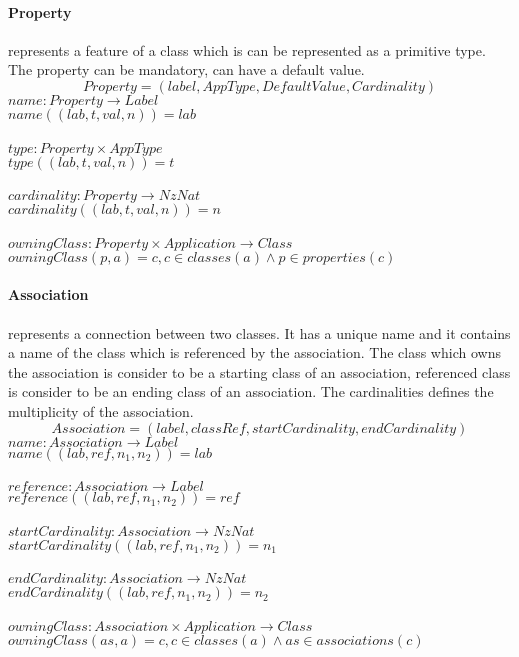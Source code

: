 \documentclass[11pt]{article}
\begin{document}
\paragraph{Property} represents a feature of  a class which is can be represented as a primitive type. The property can be mandatory, can have a default value.
$$
Property = (label, AppType, DefaultValue, Cardinality)
$$
$name : Property \rightarrow Label$ \\
$name((lab, t, val, n)) = lab$ \\ \\
$type : Property \times AppType$ \\
$type((lab, t, val, n)) = t$ \\ \\
$cardinality : Property \rightarrow NzNat$ \\
$cardinality((lab, t, val, n)) = n$ \\ \\
$owningClass : Property \times Application \rightarrow Class $ \\
$owningClass(p, a) = c, c \in classes(a) \wedge p \in properties(c) $


\paragraph {Association} represents a connection between two classes. It has a unique name and it contains a name of the class which is referenced by the association. The class which owns the association is consider to be a starting class of an association, referenced class is consider to be an ending class of an association. The cardinalities defines the multiplicity of the association.
$$
Association = (label, classRef, startCardinality, endCardinality)
$$
$name : Association \rightarrow Label$ \\
$name((lab, ref, n_1, n_2)) = lab$\\ \\
$reference : Association \rightarrow Label$ \\
$reference((lab, ref, n_1, n_2)) = ref$\\ \\
$startCardinality : Association \rightarrow NzNat$ \\
$startCardinality((lab, ref, n_1, n_2)) = n_1$\\ \\
$endCardinality : Association \rightarrow NzNat$ \\
$endCardinality((lab, ref, n_1, n_2)) = n_2$ \\ \\
$owningClass : Association \times Application \rightarrow Class $ \\
$owningClass(as, a) = c, c \in classes(a) \wedge as \in associations(c) $
\end{document}
